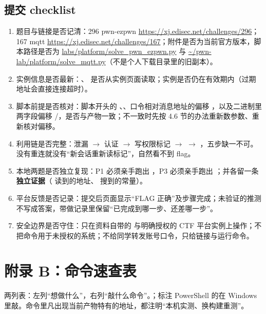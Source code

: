 \documentclass[UTF8,12pt,oneside]{ctexbook}
\begin{document}
\section*{提交 checklist}
\begin{enumerate}[label=\arabic*.]
\item 题目与链接是否记清：296 pwn-ezpwn \url{https://xj.edisec.net/challenges/296}；167 mqtt \url{https://xj.edisec.net/challenges/167}；附件是否为当前官方版本，脚本路径是否为 \url{labs/platform/solve_pwn_ezpwn.py} 与 \url{~/pwn-lab/platform/solve_mqtt.py}（不是个人下载目录里的旧副本）。
\item 实例信息是否最新：、 是否从实例页面读取；实例是否仍在有效期内（过期地址会直接连接超时）。
\item 脚本前提是否核对：脚本开头的 、、口令相对消息地址的偏移 ，以及二进制里两字段偏移 /，是否与产物一致；不一致时先按 4.6 节的办法重新数参数、重新核对偏移。
\item 利用链是否完整：泄漏 $\rightarrow$ 认证 $\rightarrow$ 写权限标记 $\rightarrow$  $\rightarrow$ ，五步缺一不可。没有重连就没有“新会话重新读标记”，自然看不到 flag。
\item 本地两题是否独立复现：P1 必须亲手跑出 ，P3 必须亲手跑出 ；并各留一条\textbf{独立证据}（ 读到的地址、 搜到的常量）。
\item 平台反馈是否记录：提交后页面显示“FLAG 正确”及步骤完成；未验证的推测不写成答案，带做记录里保留“已完成到哪一步、还差哪一步”。
\item 安全边界是否守住：只在资料自带的  与明确授权的 CTF 平台实例上操作；不把命令用于未授权的系统；不给同学转发账号口令，只给链接与运行命令。
\end{enumerate}

\chapter*{附录 B：命令速查表}
两列表：左列“想做什么”，右列“敲什么命令”。；标注 PowerShell 的在 Windows 里敲。命令里凡出现当前产物特有的地址，都注明“本机实测、换构建重测”。
\end{document}

